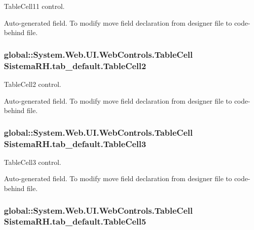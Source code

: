 TableCell11 control. 

Auto-\/generated field. To modify move field declaration from designer file to code-\/behind file. \hypertarget{class_sistema_r_h_1_1tab__default_afdae065ed4fd2471b86d637916b9180c}{
\subsubsection[{TableCell2}]{\setlength{\rightskip}{0pt plus 5cm}global::System.Web.UI.WebControls.TableCell {\bf SistemaRH.tab\_\-default.TableCell2}}}
\label{class_sistema_r_h_1_1tab__default_afdae065ed4fd2471b86d637916b9180c}


TableCell2 control. 

Auto-\/generated field. To modify move field declaration from designer file to code-\/behind file. \hypertarget{class_sistema_r_h_1_1tab__default_ad0bab6914417f679125b7429feb8f4aa}{
\subsubsection[{TableCell3}]{\setlength{\rightskip}{0pt plus 5cm}global::System.Web.UI.WebControls.TableCell {\bf SistemaRH.tab\_\-default.TableCell3}}}
\label{class_sistema_r_h_1_1tab__default_ad0bab6914417f679125b7429feb8f4aa}


TableCell3 control. 

Auto-\/generated field. To modify move field declaration from designer file to code-\/behind file. \hypertarget{class_sistema_r_h_1_1tab__default_a8d253bd47bccc6da774fe0d5b08a094c}{
\subsubsection[{TableCell5}]{\setlength{\rightskip}{0pt plus 5cm}global::System.Web.UI.WebControls.TableCell {\bf SistemaRH.tab\_\-default.TableCell5}}}
\label{class_sistema_r_h_1_1tab__default_a8d253bd47bccc6da774fe0d5b08a094c}


